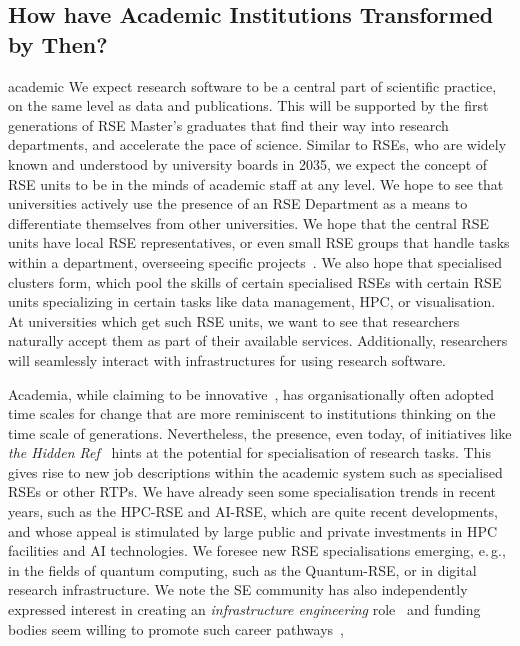 \documentclass{eceasst}
\newcommand{\eg}{e.\,g.}
\begin{document}
\subsection{How have Academic Institutions Transformed by Then?}
\begin{whatis}{}{academic}
We expect research software to be a central part of scientific practice, on the same level as data and publications.
This will be supported by the first generations of RSE Master's graduates that find their way into research departments, and accelerate the pace of science.
Similar to RSEs, who are widely known and understood by university boards in 2035, we expect the concept of RSE units to be in the minds
of academic staff at any level.
We hope to see that universities actively use the presence of an RSE Department as a means to differentiate themselves from other universities.
We hope that the central RSE units have local RSE representatives, or even small RSE groups that handle tasks within a department, overseeing specific projects~\cite{Kempf2025-draft}.
We also hope that specialised clusters form, which pool the skills of certain specialised RSEs with certain RSE units specializing in certain tasks like data management, HPC, or visualisation.
At universities which get such RSE units, we want to see that researchers naturally accept them as part of their available services.
Additionally, researchers will seamlessly interact with infrastructures for using research software.
\end{whatis}
Academia, while claiming to be innovative~\cite{wzvgbayern},
has organisationally often adopted time scales for change that are more reminiscent
to institutions thinking on the time scale of generations.
Nevertheless, the presence, even today, of initiatives like \emph{the Hidden Ref}~\cite{hiddenref}
hints at the potential for specialisation of research tasks.
This gives rise to new job descriptions within the academic system such as specialised RSEs or other RTPs.
We have already seen some specialisation trends in recent years,
such as the HPC-RSE and AI-RSE, which are quite recent developments,
and whose appeal is stimulated by large public and private investments in HPC facilities and AI technologies.
We foresee new RSE specialisations emerging, \eg, in the fields of quantum computing,
such as the Quantum-RSE, or in digital research infrastructure.
We note the SE community has also independently expressed interest in creating an \emph{infrastructure engineering} role~\cite{Sochat2024Infra}
and funding bodies seem willing to promote such career pathways~\cite{UKRI2025Infra,EuroHPC2024Federated},
\end{document}
